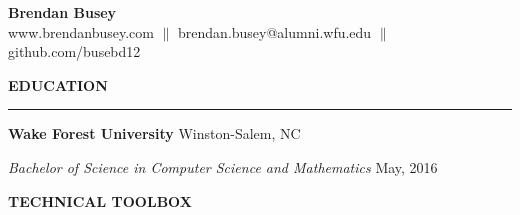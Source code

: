 \documentclass[executivepaper]{extarticle}
\begin{document}
\begin{center}

\thispagestyle{empty}

\resizebox{!}{4.3in}
{
\begin{minipage}{7.0in}


\begin{center}

\LARGE\textbf{\fontsize{14}{12}\selectfont Brendan Busey} \\

\fontsize {10}{8}\selectfont {\faDesktop} www.brendanbusey.com $\parallel$ \fontsize{10}{8}\selectfont {\faEnvelope} brendan.busey@alumni.wfu.edu  $\parallel$ \fontsize{10}{8}\selectfont {\faGithub} github.com/busebd12

\end{center}


\vspace{-1mm}

{\noindent \textbf{\fontsize{12}{9}\selectfont EDUCATION}}

\vspace{-3mm}

\noindent \rule{\textwidth}{0.5pt}

\vspace{0.5mm}

{\noindent \textbf{\fontsize{11}{8}\selectfont Wake Forest University}} {\hfill \fontsize{10}{7}\selectfont Winston-Salem, NC}

\vspace{0.5mm}

{\noindent \textit{\fontsize{11}{8}\selectfont Bachelor of Science in Computer Science and Mathematics}} {\hfill \fontsize{10}{7}\selectfont May, 2016}

\vspace{-1mm}

\vspace{3mm}


{\noindent \textbf{\fontsize{12}{9}\selectfont TECHNICAL TOOLBOX}}


\end{minipage}}
\end{center}
\end{document}
